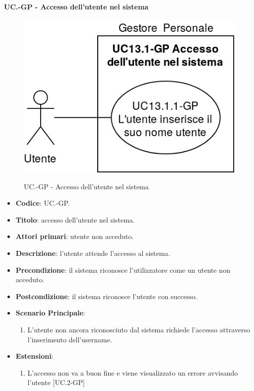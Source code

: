 	\paragraph{UC\theuccount.\thesubuccount-GP - Accesso dell'utente nel sistema}
		\begin{figure}[H]
			\centering
				\includegraphics[width=\columnwidth]{img/casi_d'uso/UC13_1.png}\\
			\caption{UC\theuccount.\thesubuccount-GP - Accesso dell'utente nel sistema}
		\end{figure}
		\begin{itemize}
			\item \textbf{Codice}: UC\theuccount.\thesubuccount-GP.
			\item \textbf{Titolo}: accesso dell'utente nel sistema.
			\item \textbf{Attori primari}: utente non acceduto.
			\item \textbf{Descrizione}: l'utente attende l'accesso al sistema.
			\item \textbf{Precondizione}: il sistema riconosce l'utilizzatore come un utente non acceduto.
			\item \textbf{Postcondizione}: il sistema riconosce l'utente con successo.
			\item \textbf{Scenario Principale}:
			\begin{enumerate}
				\item L’utente non ancora riconosciuto dal sistema richiede l'accesso attraverso l'inserimento dell'username.
			\end{enumerate}
			\item \textbf{Estensioni}:
			\begin{enumerate}
				\item L'accesso non va a buon fine e viene visualizzato un errore avvisando l'utente [UC\theuccount.2-GP]
			\end{enumerate}
		\end{itemize}
		
